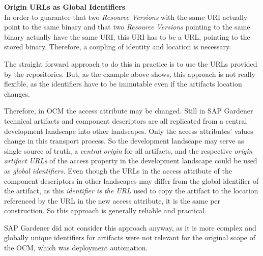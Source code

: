 \noindent\textbf{Origin URLs as Global Identifiers}\\
In order to guarantee that two \emph{Resource Versions} with the same URI actually point to the same binary and that two \emph{Resource Versions} pointing to the same binary actually have the same URI, this URI has to be a URL, pointing to the stored binary. Therefore, a coupling of identity and location is necessary.\par 
The straight forward approach to do this in practice is to use the URLs provided by the repositories. But, as the example above shows, this approach is not really flexible, as the identifiers have to be immutable even if the artifacts location changes.\par 
Therefore, in OCM the access attribute may be changed. Still in SAP Gardener technical artifacts and component descriptors are all replicated from a central development landscape into other landscapes. Only the access attributes' values change in this transport process. So the development landscape may serve as single source of truth, a \emph{central origin} for all artifacts, and the respective \emph{origin artifact URLs} of the access property in the development landscape could be used as \emph{global identifiers}. Even though the URLs in the access attribute of the component descriptors in other landscapes may differ from the global identifier of the artifact, as this \emph{identifier is the URL} used to copy the artifact to the location referenced by the URL in the new access attribute, it is the same per construction. So this approach is generally reliable and practical.\par
SAP Gardener did not consider this approach anyway, as it is more complex and globally unique identifiers for artifacts were not relevant for the original scope of the OCM, which was deployment automation.\\

